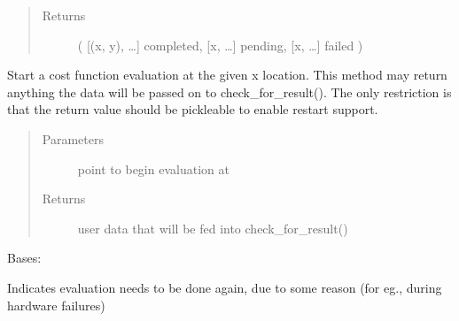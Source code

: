 \documentclass[letterpaper,12pt,english]{sphinxmanual}
\begin{document}
\begin{fulllineitems}
\begin{fulllineitems}
\begin{quote}
\begin{description}
\begin{itemize}
\end{itemize}

\item[{Returns}] \leavevmode
\sphinxAtStartPar
( {[}(x, y), …{]} completed, {[}x, …{]} pending, {[}x, …{]} failed )

\end{description}\end{quote}

\end{fulllineitems}


\begin{fulllineitems}
\label{\detokenize{PARyOpt.evaluators:PARyOpt.evaluators.paryopt_async.AsyncFunctionEvaluator.start}}
\sphinxAtStartPar
Start a cost function evaluation at the given x location.
This method may return anything \sphinxhyphen{} the data will be passed on to check\_for\_result().
The only restriction is that the return value should be pickle\sphinxhyphen{}able to enable restart support.
\begin{quote}\begin{description}
\item[{Parameters}] \leavevmode
\sphinxAtStartPar
{} \textendash{} point to begin evaluation at

\item[{Returns}] \leavevmode
\sphinxAtStartPar
user data that will be fed into check\_for\_result()

\end{description}\end{quote}

\end{fulllineitems}


\end{fulllineitems}


\begin{fulllineitems}
\label{\detokenize{PARyOpt.evaluators:PARyOpt.evaluators.paryopt_async.EvaluateAgain}}
\sphinxAtStartPar
Bases: 

\sphinxAtStartPar
Indicates evaluation needs to be done again, due to some reason (for eg., during hardware failures)

\end{fulllineitems}
\end{document}
